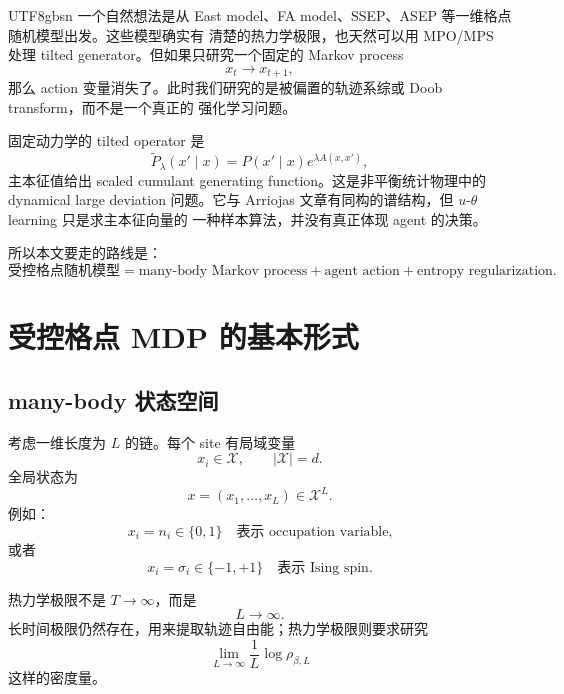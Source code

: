 \documentclass[11pt]{article}
\begin{document}
\begin{CJK*}{UTF8}{gbsn}
一个自然想法是从 East model、FA model、SSEP、ASEP 等一维格点随机模型出发。这些模型确实有
清楚的热力学极限，也天然可以用 MPO/MPS 处理 tilted generator。但如果只研究一个固定的
Markov process
\begin{equation}
    x_t\to x_{t+1},
\end{equation}
那么 action 变量消失了。此时我们研究的是被偏置的轨迹系综或 Doob transform，而不是一个真正的
强化学习问题。

固定动力学的 tilted operator 是
\begin{equation}
    \widetilde P_\lambda(x'\mid x)
    =
    P(x'\mid x)e^{\lambda A(x,x')},
\end{equation}
主本征值给出 scaled cumulant generating function。这是非平衡统计物理中的 dynamical large
deviation 问题。它与 Arriojas 文章有同构的谱结构，但 \(u\)-\(\theta\) learning 只是求主本征向量的
一种样本算法，并没有真正体现 agent 的决策。

所以本文要走的路线是：
\begin{equation}
    \boxed{
    \text{受控格点随机模型}
    =
    \text{many-body Markov process}
    +
    \text{agent action}
    +
    \text{entropy regularization}.
    }
\end{equation}

\section{受控格点 MDP 的基本形式}

\subsection{many-body 状态空间}

考虑一维长度为 \(L\) 的链。每个 site 有局域变量
\begin{equation}
    x_i\in\mathcal X,
    \qquad
    |\mathcal X|=d.
\end{equation}
全局状态为
\begin{equation}
    x=(x_1,\dots,x_L)\in\mathcal X^L.
\end{equation}
例如：
\begin{equation}
    x_i=n_i\in\{0,1\}
    \quad
    \text{表示 occupation variable,}
\end{equation}
或者
\begin{equation}
    x_i=\sigma_i\in\{-1,+1\}
    \quad
    \text{表示 Ising spin.}
\end{equation}

热力学极限不是 \(T\to\infty\)，而是
\begin{equation}
    L\to\infty.
\end{equation}
长时间极限仍然存在，用来提取轨迹自由能；热力学极限则要求研究
\begin{equation}
    \lim_{L\to\infty}\frac{1}{L}\log\rho_{\beta,L}
\end{equation}
这样的密度量。


\end{CJK*}
\end{document}
